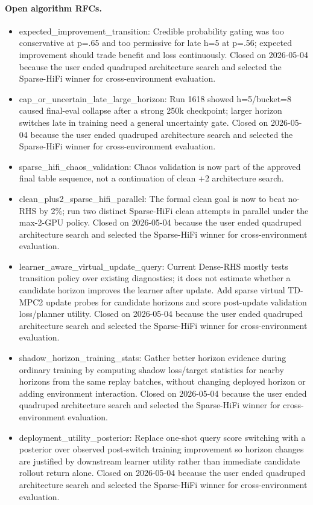 \paragraph{Open algorithm RFCs.}
\begin{itemize}
\item expected\_improvement\_transition: Credible probability gating was too conservative at p=.65 and too permissive for late h=5 at p=.56; expected improvement should trade benefit and loss continuously. Closed on 2026-05-04 because the user ended quadruped architecture search and selected the Sparse-HiFi winner for cross-environment evaluation.
\item cap\_or\_uncertain\_late\_large\_horizon: Run 1618 showed h=5/bucket=8 caused final-eval collapse after a strong 250k checkpoint; larger horizon switches late in training need a general uncertainty gate. Closed on 2026-05-04 because the user ended quadruped architecture search and selected the Sparse-HiFi winner for cross-environment evaluation.
\item sparse\_hifi\_chaos\_validation: Chaos validation is now part of the approved final table sequence, not a continuation of clean +2 architecture search.
\item clean\_plus2\_sparse\_hifi\_parallel: The formal clean goal is now to beat no-RHS by 2\%; run two distinct Sparse-HiFi clean attempts in parallel under the max-2-GPU policy. Closed on 2026-05-04 because the user ended quadruped architecture search and selected the Sparse-HiFi winner for cross-environment evaluation.
\item learner\_aware\_virtual\_update\_query: Current Dense-RHS mostly tests transition policy over existing diagnostics; it does not estimate whether a candidate horizon improves the learner after update. Add sparse virtual TD-MPC2 update probes for candidate horizons and score post-update validation loss/planner utility. Closed on 2026-05-04 because the user ended quadruped architecture search and selected the Sparse-HiFi winner for cross-environment evaluation.
\item shadow\_horizon\_training\_stats: Gather better horizon evidence during ordinary training by computing shadow loss/target statistics for nearby horizons from the same replay batches, without changing deployed horizon or adding environment interaction. Closed on 2026-05-04 because the user ended quadruped architecture search and selected the Sparse-HiFi winner for cross-environment evaluation.
\item deployment\_utility\_posterior: Replace one-shot query score switching with a posterior over observed post-switch training improvement so horizon changes are justified by downstream learner utility rather than immediate candidate rollout return alone. Closed on 2026-05-04 because the user ended quadruped architecture search and selected the Sparse-HiFi winner for cross-environment evaluation.

\end{itemize}
